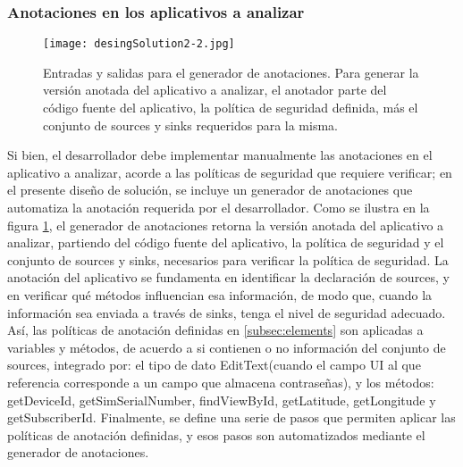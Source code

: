 \subsubsection{Anotaciones en los aplicativos a analizar}
\label{subsec:anotador}
\begin{figure}[t!]
	\begin{center}
	\texttt{[image: desingSolution2-2.jpg]}
	\end{center}
	\caption{Entradas y salidas para el generador de anotaciones.\newline
	Para generar la versión anotada del aplicativo a analizar, el anotador parte
	del código fuente del aplicativo, la política de seguridad definida, más el
	conjunto de sources y sinks requeridos para la misma.}
	\label{fig:desingSolution}
\end{figure}
Si bien, el desarrollador debe implementar manualmente las anotaciones en el
aplicativo a analizar, acorde a las políticas de seguridad que requiere
verificar; en el presente diseño de solución, se incluye un generador de
anotaciones que automatiza la anotación requerida por el desarrollador. Como se
ilustra en la figura \ref{fig:desingSolution}, el generador de anotaciones
retorna la versión anotada del aplicativo a analizar, partiendo del código
fuente del aplicativo, la política de seguridad y el conjunto de sources y
sinks, necesarios para verificar la política de seguridad.\newline
La anotación del aplicativo se fundamenta en identificar la declaración de
sources, y en verificar qué métodos influencian esa información, de modo que,
cuando la información sea enviada a través de sinks, tenga el nivel de seguridad
adecuado. Así, las políticas de anotación definidas en \ref{subsec:elements} son
aplicadas a variables y métodos, de acuerdo a si contienen o no información del
conjunto de sources, integrado por: el tipo de dato EditText(cuando el campo UI
al que referencia corresponde a un campo que almacena contraseñas), y los
métodos:
getDeviceId, getSimSerialNumber, findViewById, getLatitude, getLongitude y getSubscriberId.\newline
Finalmente, se define una serie de pasos que permiten aplicar las políticas de
anotación definidas, y esos pasos son automatizados mediante el generador de
anotaciones.












